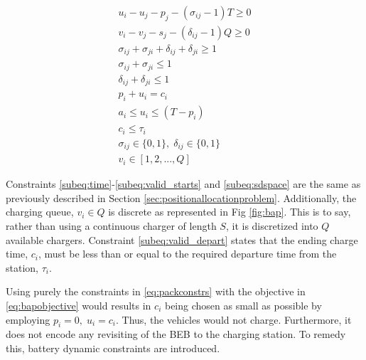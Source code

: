 \documentclass[letterpaper, 10pt, conference]{IEEEtran}
\begin{document}
\begin{subequations}
\label{eq:packconstrs}
\begin{align}
    u_i - u_j - p_j - (\sigma_{ij} - 1)T \geq 0                      \label{subeq:time}         \\
    v_i - v_j - s_j - (\delta_{ij} - 1)Q \geq 0                      \label{subeq:space}        \\
    \sigma_{ij} + \sigma_{ji} + \delta_{ij} + \delta_{ji} \geq 1     \label{subeq:valid_pos}    \\
    \sigma_{ij} + \sigma_{ji} \leq 1                                 \label{subeq:sigma}        \\
    \delta_{ij} + \delta_{ji} \leq 1                                 \label{subeq:delta}        \\
    p_i + u_i = c_i                                                  \label{subeq:detach}       \\
    a_i \leq u_i \leq (T - p_i)                                      \label{subeq:valid_starts} \\
    c_i \leq \tau_i                                                  \label{subeq:valid_depart} \\
    \sigma_{ij} \in \{0,1\},\;\delta_{ij} \in \{0,1\}                \label{subeq:sdspace}      \\
    v_i \in [1,2, ... , Q]                                          \label{subeq:vspace}
\end{align}
\end{subequations}

Constraints \eqref{subeq:time}-\eqref{subeq:valid_starts} and \eqref{subeq:sdspace} are the same as previously described in Section \ref{sec:positionallocationproblem}. Additionally, the charging queue, $v_i \in Q$ is discrete as represented in Fig \ref{fig:bap}. This is to say, rather than using a continuous charger of length $S$, it is discretized into $Q$ available chargers. Constraint \eqref{subeq:valid_depart} states that the ending charge time, $c_i$, must be less than or equal to the required departure time from the station, $\tau_i$.

Using purely the constraints in \eqref{eq:packconstrs} with the objective in \eqref{eq:bapobjective} would results in $c_i$ being chosen as small as possible by employing $p_i = 0,\; u_i = c_i$. Thus, the vehicles would not charge. Furthermore, it does not encode any revisiting of the BEB to the charging station. To remedy this, battery dynamic constraints are introduced.
\end{document}
